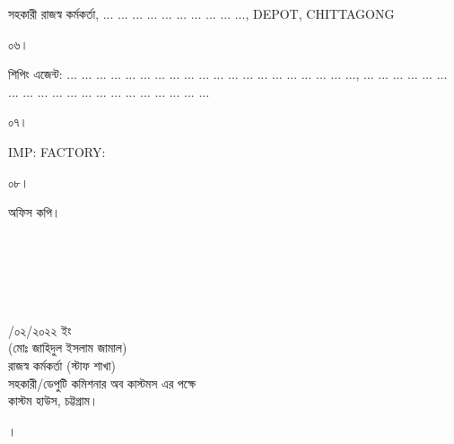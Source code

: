 \documentclass[12pt]{article}
\newcommand{\rdepo}{... ... ... ... ... ... ... ... ... ..., DEPOT, CHITTAGONG}
\newcommand{\robdt}{\hspace{2.0em}/০২/২০২২ ইং}
\newcommand{\impn}{}
\newcommand{\impadd}{}
\newcommand{\san}{... ... ... ... ... ... ... ... ... ... ... ... ... ... ... ... ... ... ... ...}
\newcommand{\sad}{... ... ... ... ... ... ... ... ... ... ... ... ... ... ... ... ... ... ... ...}
\begin{document}
\begin{minipage}[t]{0.94\linewidth}
\scriptsize{সহকারী রাজস্ব কর্মকর্তা, {\rdepo}}
\end{minipage}
\begin{minipage}[t]{0.06\linewidth}
\scriptsize{০৬।}
\end{minipage}
\begin{minipage}[t]{0.94\linewidth}
\scriptsize{শিপিং এজেন্ট:
{\san}, {\sad}}
\end{minipage}
\begin{minipage}[t]{0.06\linewidth}
\scriptsize{০৭।}
\end{minipage}
\begin{minipage}[t]{0.94\linewidth}
\scriptsize{IMP: {\impn}
FACTORY:{\impadd}}
\end{minipage}
\begin{minipage}[t]{0.06\linewidth}
\scriptsize{০৮।}
\end{minipage}
\begin{minipage}[t]{0.94\linewidth}
\scriptsize{অফিস কপি।}
\\
\\
\\
\\
\\
\\
\end{minipage}
\begin{minipage}[t]{0.60\linewidth}
\hspace{1em}
\end{minipage}
\begin{minipage}[t]{0.40\linewidth}
\begin{center}
\scriptsize{{\robdt}}
\\
\footnotesize{(মোঃ জাহিদুল ইসলাম জামাল)}
\\
\footnotesize{রাজস্ব কর্মকর্তা (স্টাফ শাখা)}
\\
\scriptsize{সহকারী/ডেপুটি কমিশনার অব কাস্টমস এর পক্ষে}
\\
\scriptsize{কাস্টম হাউস, চট্টগ্রাম।}
\end{center}
\end{minipage}
{\nfpage}
\normalsize
\begin{minipage}[t]{0.04\linewidth}
।
\end{minipage}
\end{document}
